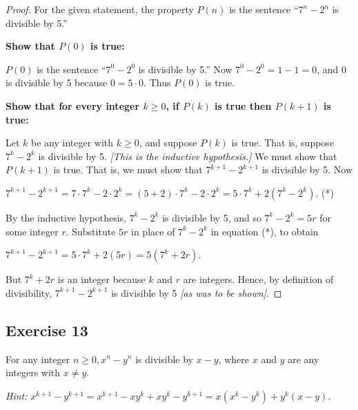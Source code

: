 \documentclass[14pt]{extarticle}
\begin{document}
\begin{proof}
    For the given statement, the property $P(n)$ is the sentence “$7^n - 2^n$ is divisible by 5.”

    {\bf Show that $P(0)$ is true:}

    $P(0)$ is the sentence “$7^0 - 2^0$ is divisible by 5.” Now $7^0 - 2^0 = 1 - 1 = 0$, and 0 is divisible by 5 because $0 = 5 \cdot 0$. Thus $P(0)$ is true.

        {\bf Show that for every integer $k \geq 0$, if $P(k)$ is true then $P(k + 1)$ is true:}

    Let $k$ be any integer with $k \geq 0$, and suppose $P(k)$ is true. That is, suppose $7^k - 2^k$ is divisible by 5. {\it [This is the inductive hypothesis.]} We must show that $P(k + 1)$ is true. That is, we must show that $7^{k+1} - 2^{k+1}$ is divisible by 5. Now

    $7^{k+1} - 2^{k+1} = 7 \cdot 7^k - 2 \cdot 2^k = (5+2) \cdot 7^k - 2 \cdot 2^k = 5 \cdot 7^k + 2(7^k - 2^k)$. (*)

    By the inductive hypothesis, $7^k - 2^k$ is divisible by 5, and so $7^k - 2^k = 5r$ for some integer $r$. Substitute $5r$ in place of $7^k - 2^k$ in equation (*), to obtain

    $7^{k+1} - 2^{k+1} = 5 \cdot 7^k + 2(5r) = 5(7^k + 2r)$.

    But $7^k + 2r$ is an integer because $k$ and $r$ are integers. Hence, by definition of divisibility, $7^{k+1} - 2^{k+1}$ is divisible by 5 {\it [as was to be shown]}.
\end{proof}

\subsection{Exercise 13}
For any integer $n \geq 0, x^n - y^n$ is divisible by $x - y$, where $x$ and $y$ are any integers with $x \neq y$.

    {\it Hint:} $x^{k+1} - y^{k+1} = x^{k+1} - xy^k + xy^k - y^{k+1} = x(x^k - y^k) + y^k(x-y)$.
\end{document}
